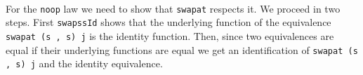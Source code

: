 \begin{code}
\AgdaOperator{\AgdaFunction{]\%=\AgdaUnderscore{}}}\AgdaSymbol{)}\AgdaSpace{}%
\AgdaSpace{}%
\<%
\\
\>[8][@{}l@{\AgdaIndent{0}}]%
\>[10]\AgdaSpace{}%
\AgdaOperator{\AgdaFunction{[}}\AgdaSpace{}%
\AgdaSpace{}%
\AgdaOperator{\AgdaFunction{]\%=}}\AgdaSpace{}%
\<%
\\
%
\>[8]\AgdaSpace{}%
\AgdaSpace{}%
\AgdaSpace{}%
\AgdaSpace{}%
\<%
\\
%
\\[\AgdaEmptyExtraSkip]%
\>[0]\AgdaSpace{}%
\AgdaSymbol{:}\AgdaSpace{}%
\AgdaSymbol{(}\AgdaSpace{}%
\AgdaSpace{}%
\AgdaSymbol{)}\AgdaSpace{}%
\AgdaSpace{}%
\AgdaSpace{}%
\AgdaSpace{}%
\AgdaSpace{}%
\AgdaSpace{}%
\AgdaSpace{}%
\<%
\\
\>[0]\AgdaSpace{}%
\AgdaSymbol{(}\AgdaSpace{}%
\AgdaOperator{\AgdaInductiveConstructor{,}}\AgdaSpace{}%
\AgdaSymbol{)}\AgdaSpace{}%
\AgdaSpace{}%
\AgdaSymbol{=}\AgdaSpace{}%
\<%
\\
\>[0][@{}l@{\AgdaIndent{0}}]%
\>[2]\AgdaSymbol{(}\AgdaSpace{}%
\AgdaSymbol{(}\AgdaSpace{}%
\AgdaSpace{}%
\AgdaSpace{}%
\AgdaSymbol{)}\AgdaSpace{}%
\AgdaSymbol{(}\AgdaSpace{}%
\AgdaSpace{}%
\AgdaSpace{}%
\AgdaSymbol{)}\AgdaSpace{}%
\AgdaSymbol{(}\AgdaSpace{}%
\AgdaSpace{}%
\AgdaSpace{}%
\AgdaSymbol{)}\AgdaSpace{}%
\AgdaSymbol{(}\AgdaSpace{}%
\AgdaSpace{}%
\AgdaSpace{}%
\AgdaSymbol{))}\<%
\end{code}
For the \texttt{noop} law we need to show that \texttt{swapat} respects it.
We proceed in two steps. First \texttt{swapssId} shows that the underlying function of the equivalence
\texttt{swapat (s , s) j} is the identity function. Then, since two equivalences are equal if their
underlying functions are equal we get an identification of \texttt{swapat (s , s) j} and the identity equivalence.
